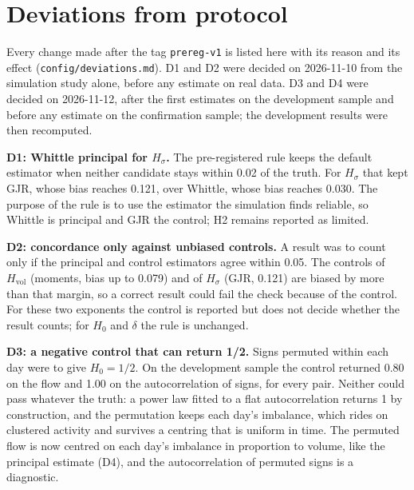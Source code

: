 \documentclass[11pt]{article}
\newcommand{\Hz}{H_0}
\newcommand{\Hv}{H_{\mathrm{vol}}}
\newcommand{\Hs}{H_\sigma}
\begin{document}
\section{Deviations from protocol}
\label{sec:deviations}
Every change made after the tag \texttt{prereg-v1} is listed here with its reason and its
effect (\texttt{config/deviations.md}). D1 and D2 were decided on 2026-11-10 from the
simulation study alone, before any estimate on real data. D3 and D4 were decided on
2026-11-12, after the first estimates on the development sample and before any estimate on
the confirmation sample; the development results were then recomputed.

\textbf{D1: Whittle principal for $\Hs$.} The pre-registered rule keeps the default
estimator when neither candidate stays within 0.02 of the truth. For $\Hs$ that kept GJR,
whose bias reaches 0.121, over Whittle, whose bias reaches 0.030. The purpose of the rule is
to use the estimator the simulation finds reliable, so Whittle is principal and GJR the
control; H2 remains reported as limited.

\textbf{D2: concordance only against unbiased controls.} A result was to count only if the
principal and control estimators agree within 0.05. The controls of $\Hv$ (moments,
bias up to 0.079) and of $\Hs$ (GJR, 0.121) are biased by more than that margin, so a correct
result could fail the check because of the control. For these two exponents the control is
reported but does not decide whether the result counts; for $\Hz$ and $\delta$ the rule is
unchanged.

\textbf{D3: a negative control that can return 1/2.} Signs permuted within each day were
to give $\Hz=1/2$. On the development sample the control returned 0.80 on the flow and
1.00 on the autocorrelation of signs, for every pair. Neither could pass whatever the
truth: a power law fitted to a flat autocorrelation returns 1 by construction, and the
permutation keeps each day's imbalance, which rides on clustered activity and survives a
centring that is uniform in time. The permuted flow is now centred on each day's imbalance
in proportion to volume, like the principal estimate (D4), and the autocorrelation of
permuted signs is a diagnostic.
\end{document}
